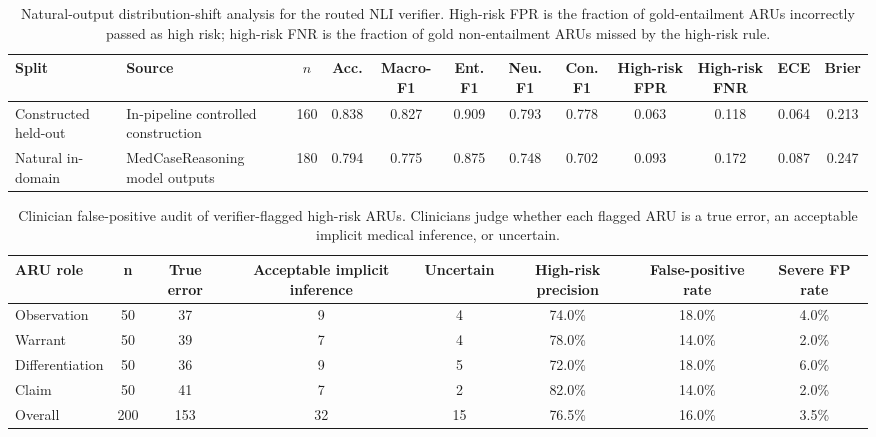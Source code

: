\documentclass[a4paper,fleqn,doubleblind]{cas-sc}
\begin{document}
\begin{table}[htbp]
    \centering
    \begingroup\color{blue}
    \scriptsize
    \setlength{\tabcolsep}{3pt}
    \caption{Natural-output distribution-shift analysis for the routed NLI verifier. High-risk FPR is the fraction of gold-entailment ARUs incorrectly passed as high risk; high-risk FNR is the fraction of gold non-entailment ARUs missed by the high-risk rule.}
    \label{tab:nli_natural_output_shift}
    \begin{adjustbox}{max width=\textwidth}
    \begin{tabular}{llcccccccccc}
        \toprule
        \textbf{Split} & \textbf{Source} & \textbf{$n$} & \textbf{Acc.} & \textbf{Macro-F1} & \textbf{Ent. F1} & \textbf{Neu. F1} & \textbf{Con. F1} & \textbf{High-risk FPR} & \textbf{High-risk FNR} & \textbf{ECE} & \textbf{Brier} \\
        \midrule
        Constructed held-out & In-pipeline controlled construction & 160 & 0.838 & 0.827 & 0.909 & 0.793 & 0.778 & 0.063 & 0.118 & 0.064 & 0.213 \\
        Natural in-domain & MedCaseReasoning model outputs & 180 & 0.794 & 0.775 & 0.875 & 0.748 & 0.702 & 0.093 & 0.172 & 0.087 & 0.247 \\
        \bottomrule
    \end{tabular}
    \end{adjustbox}
    \endgroup
\end{table}

\begin{table}[htbp]
    \centering
    \begingroup\color{blue}
    \caption{Clinician false-positive audit of verifier-flagged high-risk ARUs. Clinicians judge whether each flagged ARU is a true error, an acceptable implicit medical inference, or uncertain.}
    \label{tab:high_risk_aru_clinician_audit}
    \begin{adjustbox}{max width=0.98\textwidth}
    \begin{tabular}{lccccccc}
        \toprule
        \textbf{ARU role} & \textbf{n} & \textbf{True error} & \textbf{Acceptable implicit inference} & \textbf{Uncertain} & \textbf{High-risk precision} & \textbf{False-positive rate} & \textbf{Severe FP rate} \\
        \midrule
        Observation & 50 & 37 & 9 & 4 & 74.0\% & 18.0\% & 4.0\% \\
        Warrant & 50 & 39 & 7 & 4 & 78.0\% & 14.0\% & 2.0\% \\
        Differentiation & 50 & 36 & 9 & 5 & 72.0\% & 18.0\% & 6.0\% \\
        Claim & 50 & 41 & 7 & 2 & 82.0\% & 14.0\% & 2.0\% \\
        \midrule
        Overall & 200 & 153 & 32 & 15 & 76.5\% & 16.0\% & 3.5\% \\
        \bottomrule
    \end{tabular}
    \end{adjustbox}
    \endgroup
\end{table}
\end{document}
